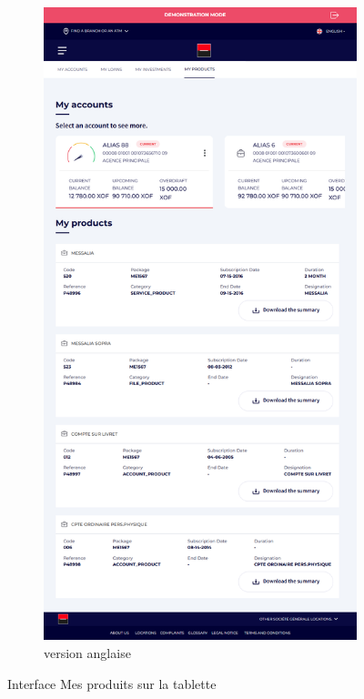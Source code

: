 \begin{figure}[!ht]
\begin{subfigure}[b]{0.49\textwidth}
    \end{subfigure}
    \hfill
    \begin{subfigure}[b]{0.49\textwidth}
        \centering
        \includegraphics[width=\textwidth]{images/screens/products/tablette.png}
        \caption{version anglaise}
    \end{subfigure}
       \caption{Interface Mes produits sur la tablette}
\end{figure}
\newpage

